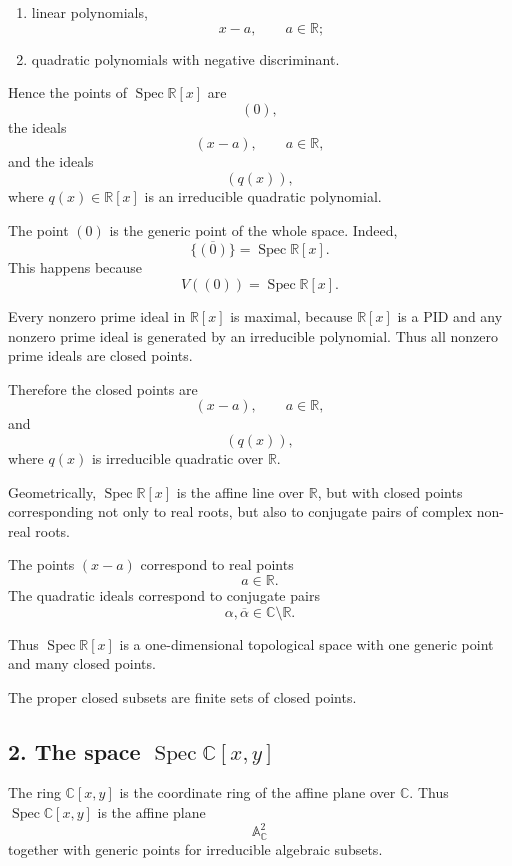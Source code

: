 \documentclass[12pt,a4paper]{article}
\newcommand{\Spec}{\operatorname{Spec}}
\begin{document}
	\begin{enumerate}[label=\arabic*)]
		\item linear polynomials,
		\[
		x-a,
		\qquad a\in \mathbb R;
		\]
		
		\item quadratic polynomials with negative discriminant.
	\end{enumerate}
	
	Hence the points of \(\Spec\mathbb R[x]\) are
	\[
	(0),
	\]
	the ideals
	\[
	(x-a),
	\qquad a\in \mathbb R,
	\]
	and the ideals
	\[
	(q(x)),
	\]
	where \(q(x)\in\mathbb R[x]\) is an irreducible quadratic polynomial.
	
	The point \((0)\) is the generic point of the whole space. Indeed,
	\[
	\overline{\{(0)\}}=\Spec\mathbb R[x].
	\]
	This happens because
	\[
	V((0))=\Spec\mathbb R[x].
	\]
	
	Every nonzero prime ideal in \(\mathbb R[x]\) is maximal, because \(\mathbb R[x]\)
	is a PID and any nonzero prime ideal is generated by an irreducible polynomial.
	Thus all nonzero prime ideals are closed points.
	
	Therefore the closed points are
	\[
	(x-a),
	\qquad a\in\mathbb R,
	\]
	and
	\[
	(q(x)),
	\]
	where \(q(x)\) is irreducible quadratic over \(\mathbb R\).
	
	Geometrically, \(\Spec\mathbb R[x]\) is the affine line over \(\mathbb R\), but
	with closed points corresponding not only to real roots, but also to conjugate
	pairs of complex non-real roots.
	
	The points \((x-a)\) correspond to real points
	\[
	a\in\mathbb R.
	\]
	The quadratic ideals correspond to conjugate pairs
	\[
	\alpha,\overline{\alpha}\in\mathbb C\setminus \mathbb R.
	\]
	
	Thus \(\Spec\mathbb R[x]\) is a one-dimensional topological space with one
	generic point and many closed points.
	
	The proper closed subsets are finite sets of closed points.
	
	\subsection*{2. The space \(\Spec \mathbb C[x,y]\)}
	
	The ring \(\mathbb C[x,y]\) is the coordinate ring of the affine plane over
	\(\mathbb C\). Thus \(\Spec\mathbb C[x,y]\) is the affine plane
	\[
	\mathbb A^2_{\mathbb C}
	\]
	together with generic points for irreducible algebraic subsets.
	
\end{document}
